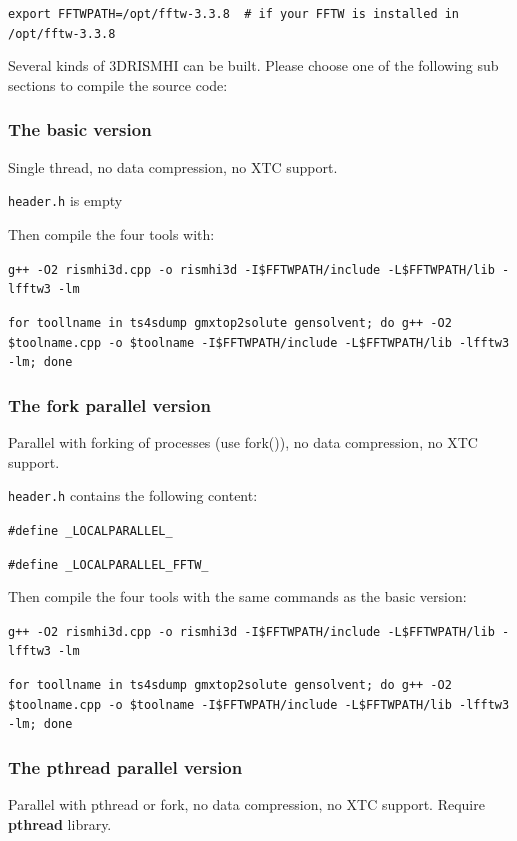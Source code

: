 \documentclass[aip,amsmath,amssymb,reprint,onecolumn]{revtex4-1}
\begin{document}
\texttt{\small\color{blue}export FFTWPATH=/opt/fftw-3.3.8 {\color{lightgray} \# if your FFTW is installed in /opt/fftw-3.3.8}}

Several kinds of 3DRISMHI can be built. Please choose one of the following sub sections to compile the source code:

\subsubsection{The basic version}

Single thread, no data compression, no XTC support.

\texttt{header.h} is empty

Then compile the four tools with:

\texttt{\small\color{blue}g++ -O2 rismhi3d.cpp -o rismhi3d -I\$FFTWPATH/include -L\$FFTWPATH/lib -lfftw3 -lm}

\texttt{\small\color{blue}for toollname in ts4sdump gmxtop2solute gensolvent; do g++ -O2 \$toolname.cpp -o \$toolname -I\$FFTWPATH/include -L\$FFTWPATH/lib -lfftw3 -lm; done}

\subsubsection{The fork parallel version}

Parallel with forking of processes (use fork()), no data compression, no XTC support.

\texttt{header.h} contains the following content:

\texttt{\small\color{navyblue}\#define \_LOCALPARALLEL\_}

\texttt{\small\color{navyblue}\#define \_LOCALPARALLEL\_FFTW\_}

Then compile the four tools with the same commands as the basic version:

\texttt{\small\color{blue}g++ -O2 rismhi3d.cpp -o rismhi3d -I\$FFTWPATH/include -L\$FFTWPATH/lib -lfftw3 -lm}

\texttt{\small\color{blue}for toollname in ts4sdump gmxtop2solute gensolvent; do g++ -O2 \$toolname.cpp -o \$toolname -I\$FFTWPATH/include -L\$FFTWPATH/lib -lfftw3 -lm; done}

\subsubsection{The pthread parallel version}

Parallel with pthread or fork, no data compression, no XTC support. Require {\bf pthread} library.
\end{document}
